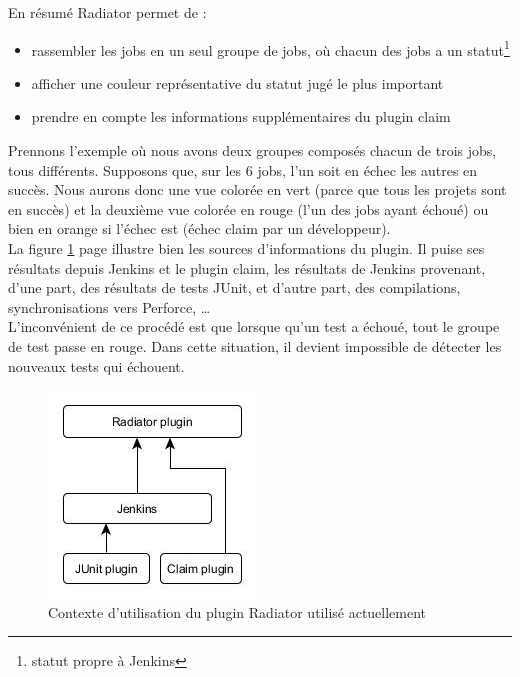 En résumé Radiator permet de :
\begin{itemize}
	\item rassembler les jobs en un seul groupe de jobs, où chacun des jobs a un statut\footnote{statut propre à Jenkins}
	\item afficher une couleur représentative du statut jugé le plus important
	\item prendre en compte les informations supplémentaires du plugin claim
\end{itemize}
Prennons l'exemple où nous avons deux groupes composés chacun de trois jobs, tous différents. Supposons que, sur les 6 jobs, l'un soit en échec les autres en succès. Nous aurons donc une vue colorée en vert (parce que tous les projets sont en succès) et la deuxième vue colorée en rouge (l'un des jobs ayant échoué) ou bien en orange si l'échec est  (échec claim par un développeur).\\
La figure \ref{figure:RadiatorInformationSources} page \pageref{figure:RadiatorInformationSources} illustre bien les sources d'informations du plugin. Il puise ses résultats depuis Jenkins et le plugin claim, les résultats de Jenkins provenant, d'une part, des résultats de tests JUnit, et d'autre part, des compilations, synchronisations vers Perforce, \ldots\\
L'inconvénient de ce procédé est que lorsque qu'un test a échoué, tout le groupe de test passe en rouge. Dans cette situation, il devient impossible de détecter les nouveaux tests qui échouent.




\begin{figure}[!h]
  \centering
      \includegraphics[scale=0.5]{images/RadiatorInformationSources.jpg}
  \caption{Contexte d'utilisation du plugin Radiator utilisé actuellement}
	\label{figure:RadiatorInformationSources}
\end{figure}





